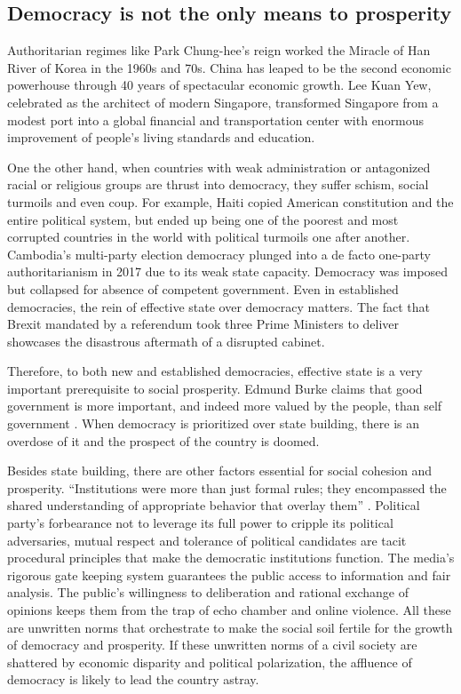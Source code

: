 \documentclass{scrartcl}
\theoremstyle{definition}
\begin{document}
\subsection{Democracy is not the only means to prosperity}

Authoritarian regimes like Park Chung-hee's reign worked the Miracle
of Han River of Korea in the 1960s and 70s. China has leaped to be
the second economic powerhouse through 40 years of spectacular economic
growth. Lee Kuan Yew, celebrated as the architect of modern Singapore,
transformed Singapore from a modest port into a global financial and
transportation center with enormous improvement of people's living
standards and education. 

One the other hand, when countries with weak administration or antagonized
racial or religious groups are thrust into democracy, they suffer
schism, social turmoils and even coup. For example, Haiti copied American
constitution and the entire political system, but ended up being one
of the poorest and most corrupted countries in the world with political
turmoils one after another. Cambodia’s multi-party election democracy
plunged into a de facto one-party authoritarianism in 2017 due to
its weak state capacity. Democracy was imposed but collapsed for absence
of competent government. Even in established democracies, the rein
of effective state over democracy matters. The fact that Brexit mandated
by a referendum took three Prime Ministers to deliver showcases the
disastrous aftermath of a disrupted cabinet. 

Therefore, to both new and established democracies, effective state
is a very important prerequisite to social prosperity. Edmund Burke
claims that good government is more important, and indeed more valued
by the people, than self government \autocite[70]{scand}. When democracy
is prioritized over state building, there is an overdose of it and
the prospect of the country is doomed. 

Besides state building, there are other factors essential for social
cohesion and prosperity. ``Institutions were more than just formal
rules; they encompassed the shared understanding of appropriate behavior
that overlay them'' \autocite[213]{demdie}. Political party's forbearance
not to leverage its full power to cripple its political adversaries,
mutual respect and tolerance of political candidates are tacit procedural
principles that make the democratic institutions function. The media's
rigorous gate keeping system guarantees the public access to information
and fair analysis. The public's willingness to deliberation and rational
exchange of opinions keeps them from the trap of echo chamber and
online violence. All these are unwritten norms that orchestrate to
make the social soil fertile for the growth of democracy and prosperity.
If these unwritten norms of a civil society are shattered by economic
disparity and political polarization, the affluence of democracy is
likely to lead the country astray. 
\end{document}

